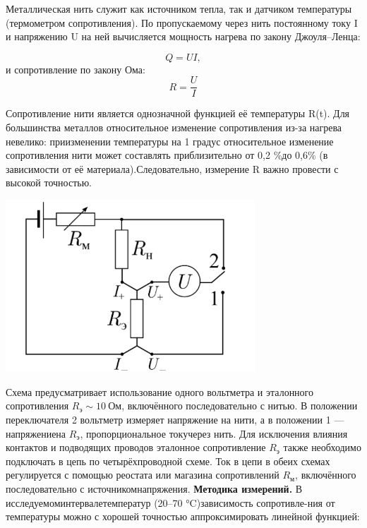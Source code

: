 \newpage

Металлическая нить служит как источником тепла, так и датчиком температуры (термометром сопротивления). По пропускаемому через нить постоянному току I и напряжению U на ней вычисляется мощность нагрева по закону Джоуля–Ленца:

\begin{equation*}
	Q = UI,
\end{equation*}
и сопротивление по закону Ома:
\begin{equation*}
	R = \frac{U}{I}
\end{equation*}

Сопротивление нити является однозначной функцией её температуры R(t). Для большинства металлов относительное изменение сопротивления из-за нагрева невелико: приизменении температуры на 1 градус относительное изменение сопротивления нити может составлять приблизительно от 0,2 \%до 0,6\% (в зависимости от её материала).Следовательно, измерение R важно провести с высокой точностью.

\begin{center}
\includegraphics[width=0.7\textwidth]{elec.png}
\end{center}

Схема предусматривает использование одного вольтметра и эталонного сопротивления $R_э\sim10 \: Ом$, включённого последовательно с нитью. В положении переключателя 2 вольтметр измеряет напряжение на нити, а в положении 1 — напряжениена $R_э$, пропорциональное токучерез нить. Для исключения влияния контактов и подводящих проводов эталонное сопротивление $R_э$ также   необходимо подключать в цепь по четырёхпроводной схеме.
Ток в цепи в обеих схемах регулируется с помощью реостата или магазина сопротивлений $R_м$, включённого последовательно с источникомнапряжения.
\textbf{Методика  измерений.} В исследуемоминтервалетемператур (20–70 °C)зависимость сопротивле-ния  от температуры можно с хорошей точностью аппроксимировать линейной функцией:

